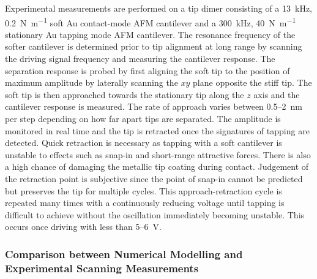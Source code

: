 \documentclass{article}
\begin{document}
Experimental measurements are performed on a tip dimer consisting of a \SI{13}{kHz}, \SI{0.2}{N.m^{-1}} soft Au contact-mode AFM cantilever and a \SI{300}{kHz}, \SI{40}{N.m^{-1}} stationary Au tapping mode AFM cantilever. The resonance frequency of the softer cantilever is determined prior to tip alignment at long range by scanning the driving signal frequency and measuring the cantilever response. The separation response is probed by first aligning the soft tip to the position of maximum amplitude by laterally scanning the $xy$ plane opposite the stiff tip. The soft tip is then approached towards the stationary tip along the $z$ axis and the cantilever response is measured. The rate of approach varies between 0.5--\SI{2}{nm} per step depending on how far apart tips are separated. The amplitude is monitored in real time and the tip is retracted once the signatures of tapping are detected. Quick retraction is necessary as tapping with a soft cantilever is unstable to effects such as snap-in and short-range attractive forces. There is also a high chance of damaging the metallic tip coating during contact. Judgement of the retraction point is subjective since the point of snap-in cannot be predicted but preserves the tip for multiple cycles. This approach-retraction cycle is repeated many times with a continuously reducing voltage until tapping is difficult to achieve without the oscillation immediately becoming unstable. This occurs once driving with less than 5--\SI{6}{V}.

\subsubsection{Comparison between Numerical Modelling and Experimental Scanning Measurements}
\end{document}
